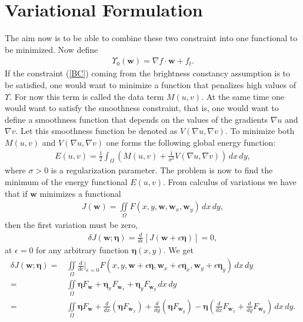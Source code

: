\section{Variational Formulation}
The aim now is to be able to combine these two constraint into one functional to be minimized. Now define
\begin{align*}
\Upsilon_0(\textbf{w}) = \nabla f \cdot \textbf{w} + f_t.
\end{align*}
If the constraint (\ref{BC}) coming from the brightness constancy assumption is to be satisfied, one would want to minimize a function that penalizes high values of $\Upsilon$. For now this term is called the data term $M(u,v)$. At the same time one would want to satisfy the smoothness constraint, that is, one would want to define a smoothness function that depends on the values of the gradients $\nabla u$ and $\nabla v$. Let this smoothness function be denoted as $V(\nabla u, \nabla v)$. To minimize both $M(u,v)$ and $V(\nabla u, \nabla v)$ one forms the following global energy function:
\begin{align}
\label{OF_funtional}
E(u,v) = \frac{1}{2} \int_\Omega (M(u,v) + \frac{1}{\sigma^2} V(\nabla u, \nabla v)) \, dx \, dy,
\end{align}
where $\sigma > 0$ is a regularization parameter. The problem is now to find the minimum of the energy functional $E(u,v)$. From calculus of variations we have that if $\textbf{w}$ minimizes a functional
\begin{align*}
J(\textbf{w}) = \iint \limits_\Omega F(x,y,\textbf{w},\textbf{w}_x,\textbf{w}_y) \, dx \, dy,
\end{align*} 
then the first variation must be zero,
\begin{align*}
\delta J(\textbf{w};\bm{\eta}) = \frac{d}{d \epsilon} \left[ J(\textbf{w} + \epsilon \bm{\eta}) \right] = 0,
\end{align*}
at $\epsilon = 0$ for any arbitrary function $\bm{\eta}(x,y)$. We get
\begin{align*}
\delta J(\textbf{w};\bm{\eta}) =&  \iint \limits_{\Omega} \frac{d}{d \epsilon}\Big|_{\epsilon = 0} F(x,y,\textbf{w} + \epsilon \bm{\eta}, \textbf{w}_x + \epsilon \bm{\eta}_x, \textbf{w}_y + \epsilon \bm{\eta}_y) \, dx \, dy \\
=&  \iint \limits_{\Omega} \bm{\eta} F_\textbf{w} + \bm{\eta}_x F_{\textbf{w}_x} + \bm{\eta}_y F_{\textbf{w}_y} \, dx \, dy \\
=& \iint \limits_{\Omega} \bm{\eta} F_\textbf{w} + \frac{d}{d x} (\bm{\eta} F_{\textbf{w}_x}) + \frac{d }{d y} (\bm{\eta} F_{\textbf{w}_y}) - \bm{\eta} \left( \frac{d}{d x} F_{\textbf{w}_x} + \frac{d }{d y} F_{\textbf{w}_y} \right) \, dx \, dy.
\end{align*}
